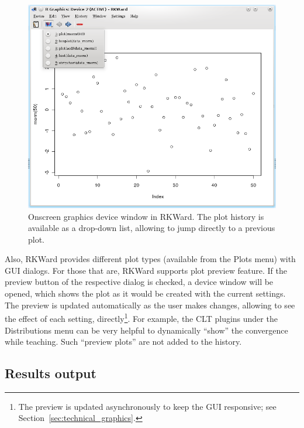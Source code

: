 \begin{figure}[htp]
 \centering
 \includegraphics{../figures/plot_history_cropped.png}
 \caption{Onscreen graphics device window in RKWard. The plot history is available as a drop-down list, allowing to
 jump directly to a previous plot.}
 \label{fig:plot_history}
\end{figure}

Also, RKWard provides different plot types (available from the Plots
menu) with GUI dialogs. For those that are, RKWard supports plot
preview feature. If the preview button of
the respective dialog is checked, a device window will be opened, which
shows the plot as it would be created with the current settings. The
preview is updated automatically as the user makes changes, allowing to
see the effect of each setting, directly\footnote{The preview is
updated asynchronously to keep the GUI responsive; see Section~\ref{sec:technical_graphics}.}. For example, the CLT plugins
under the Distributions menu can be very helpful to dynamically ``show''
the convergence while teaching. Such ``preview plots'' are not added to
the history.

\subsection{Results output}
\label{sec:results_output}

